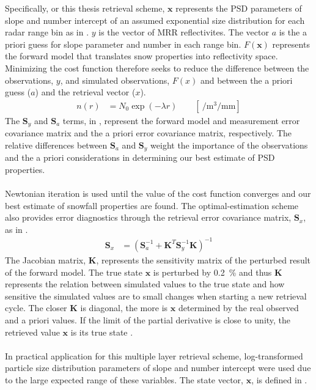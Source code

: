 Specifically, or this thesis retrieval scheme, $\mathbf{x}$ represents the PSD parameters of slope and number intercept of an assumed exponential size distribution for each radar range bin as in . $y$ is the vector of MRR reflectivites. The vector $a$ is the a priori guess for slope parameter and number in each range bin. $F(\mathbf{x})$ represents the forward model that translates snow properties into reflectivity space.  Minimizing the cost function therefore seeks to reduce the difference between the observations, $y$, and simulated observations, $F(x)$ and between the a priori guess ($a$) and the retrieval vector ($x$).
\begin{align}
	n(r) & = N_{0} \exp\left(-\lambda r\right) \qquad [ \SI{}{\per\cubic\metre\per\mm} ] \label{eq:num_dens}
\end{align}
The $\mathbf{S}_y$ and $\mathbf{S}_{a}$ terms, in , represent the forward model and measurement error covariance matrix and the a priori error covariance matrix, respectively. The relative differences between $\mathbf{S}_{a}$ and $\mathbf{S}_y$ weight the importance of the observations and the a priori considerations in determining our best estimate of PSD properties. 
\\
\\
Newtonian iteration is used until the value of the cost function converges and our best estimate of snowfall properties are found.  The optimal-estimation scheme also provides error diagnostics through the retrieval error covariance matrix, $\mathbf{S}_x$, as in .
\begin{align}
	\mathbf{S}_x & = \left( \mathbf{S}_a^{-1} + \mathbf{K}^T \mathbf{S}_y^{-1} \mathbf{K} \right)^{-1}\label{eq:Sx}
\end{align}
The Jacobian matrix, $\mathbf{K}$, represents the sensitivity matrix of the perturbed result of the forward model. The true state $\mathbf{x}$ is perturbed by \SI{0.2}{\percent} and thus $\mathbf{K}$ represents the relation between simulated values to the true state and how sensitive the simulated values are to small changes when starting a new retrieval cycle. The closer $\mathbf{K}$ is diagonal, the more is $\mathbf{x}$ determined by the real observed and a priori values. If the limit of the partial derivative is close to unity, the retrieved value $\mathbf{x}$ is its true state \citep{wood_estimation_2011}.
\\
\\
In practical application for this multiple layer retrieval scheme, log-transformed particle size distribution parameters of slope and number intercept were used due to the large expected range of these variables. The state vector, $\mathbf{x}$, is defined in .
